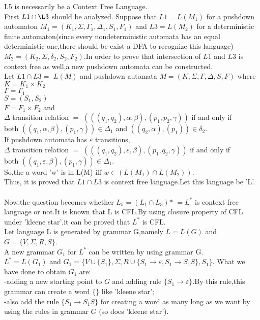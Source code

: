 \documentclass[a4paper,12pt]{article}
\begin{document}
\begin{tcolorbox}

L5 is necessarily be a Context Free Language.\\

First $L1 \cap \L3$ should be analyzed.
Suppose that $L1=L(M_1)$ for a pushdown automaton ${M_1}=(K_1,\Sigma,\Gamma_1,\Delta_1,S_1,F_1)$ and $L3=L(M_2)$ for a deterministic finite automaton(since every nondeterministic automata has an equal deterministic one,there should be exist a DFA to recognize this language) ${M_2}=(K_2,\Sigma,\delta_2,S_2,F_2)$.In order to prove that intersection of $L1$ and $L3$ is context free as well,a new pushdown automata can be constructed.\\
Let $L1 \cap L3=$ $L(M)$ and pushdown automata $M=(K,\Sigma,\Gamma,\Delta,S,F)$ where \\
$K=K_1\times K_2$\\
$\Gamma = \Gamma_1$\\
$S=(S_1,S_2)$ \\
$F = F_1 \times F_2$ and \\
$\Delta$ transition relation $=$ $(((q_1,q_2),\alpha,\beta),(p_1,p_2,\gamma))$ if and only if \\ both $((q_1,\alpha,\beta),(p_1,\gamma)) \in \Delta_1$  and $((q_2,\alpha),(p_1)) \in \delta_2$.\\
If pushdown automata has $\varepsilon$ transitions,\\
$\Delta$ transition relation $=$ $(((q_1,q_2),\varepsilon,\beta),(p_1,q_2,\gamma))$ if and only if\\
both $((q_1,\varepsilon,\beta),(p_1,\gamma)) \in \Delta_1$.\\
So,the a word 'w' is in L(M) iff $w \in (L(M_1)\cap L(M_2))$.\\
Thus, it is proved that $L1 \cap L3$ is context free language.Let this language be 'L'.\\\\
Now,the question becomes whether $L_5 = (L_1 \cap L_3)\text{*}$ $=L^*$ is context free language or not.It is known that L is CFL.By using closure property of CFL under 'kleene star',it can be proved that $L^*$ is CFL.\\ 
Let language L is generated by grammar G,namely $L=L(G)$ and $G=\{V,\Sigma,R,S\}$.\\
A new grammar $G_1$ for $L^*$ can be written by using grammar G.\\
$L^*=L(G_1)$ and $G_1=\{V\cup \{S_1\},\Sigma,R\cup \{S_1 \to \varepsilon,S_1 \to S_1S\},S_1\}$.
What we have done to obtain $G_1$ are:\\ -adding a new starting point to $G$ and adding rule $\{S_1 \to \varepsilon\}$.By this rule,this grammar can create a word $\{\}$ like 'kleene star';\\-also add the rule $\{S_1 \to S_1S\}$ for creating a word as many long as we want by using the rules in grammar $G$ (so does 'kleene star').\\\\

\end{tcolorbox}
\end{document}
